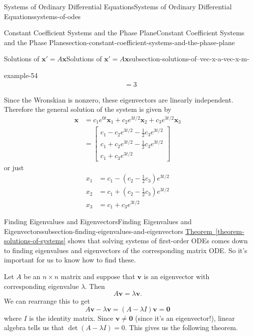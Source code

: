 \documentclass[oneside,10pt,]{book}
\numberwithin{equation}{section}
\renewcommand{\vec}[1]{\mathbf{#1}}
\newcommand{\parens}[1]{\left( #1 \right)}
\newcommand{\amp}{&}
\begin{document}
\begin{chapterptx}{Systems of Ordinary Differential Equations}{}{Systems of Ordinary Differential Equations}{}{}{systems-of-odes}
\begin{sectionptx}{Constant Coefficient Systems and the Phase Plane}{}{Constant Coefficient Systems and the Phase Plane}{}{}{section-constant-coefficient-systems-and-the-phase-plane}
\begin{subsectionptx}{Solutions of \(\vec{x}' = A\vec{x}\)}{}{Solutions of \(\vec{x}' = A\vec{x}\)}{}{}{subsection-solutions-of--vec-x-a-vec-x-m-}
\begin{example}{}{example-54}
\begin{align*}
\amp = 3
\end{align*}
%
\par
\hypertarget{p-329}{}%
Since the Wronskian is nonzero, these eigenvectors are linearly independent. Therefore the general solution of the system is given by%
\begin{align*}
\vec{x} \amp = c_{1}e^{0t}\vec{x}_{1}+c_{2}e^{3t/2}\vec{x}_{2}+c_{3}e^{3t/2}\vec{x}_{3}\\
\amp = \begin{bmatrix}c_{1}-c_{2}e^{3t/2}-\frac{1}{2}c_{3}e^{3t/2} \\ c_{1}+c_{2}e^{3t/2}-\frac{1}{2}c_{3}e^{3t/2} \\ c_{1}+c_{3}e^{3t/2}\end{bmatrix}
\end{align*}
or just%
\begin{align*}
x_{1} \amp = c_{1}-\parens{c_{2}-\frac{1}{2}c_{3}}e^{3t/2}\\
x_{2} \amp = c_{1}+\parens{c_{2}-\frac{1}{2}c_{3}}e^{3t/2}\\
x_{3} \amp = c_{1}+c_{3}e^{3t/2}
\end{align*}
%
\end{example}
\end{subsectionptx}
%
%
\typeout{************************************************}
\typeout{************************************************}
%
\begin{subsectionptx}{Finding Eigenvalues and Eigenvectors}{}{Finding Eigenvalues and Eigenvectors}{}{}{subsection-finding-eigenvalues-and-eigenvectors}
\hypertarget{p-330}{}%
\hyperref[theorem-solutions-of-systems]{Theorem~\ref{theorem-solutions-of-systems}} shows that solving systems of first-order ODEs comes down to finding eigenvalues and eigenvectors of the corresponding matrix ODE. So it's important for us to know how to find these.%
\par
\hypertarget{p-331}{}%
Let \(A\) be an \(n\times n\) matrix and suppose that \(\vec{v}\) is an eigenvector with corresponding eigenvalue \(\lambda\). Then%
\begin{equation*}
A\vec{v} = \lambda\vec{v}.
\end{equation*}
We can rearrange this to get%
\begin{equation*}
A\vec{v}-\lambda\vec{v} = (A-\lambda I)\vec{v} = \vec{0}
\end{equation*}
where \(I\) is the identity matrix. Since \(\vec{v}\neq\vec{0}\) (since it's an eigenvector!), linear algebra tells us that \(\det(A-\lambda I) = 0\). This gives us the following theorem.%

\end{subsectionptx}
\end{sectionptx}
\end{chapterptx}
\end{document}
